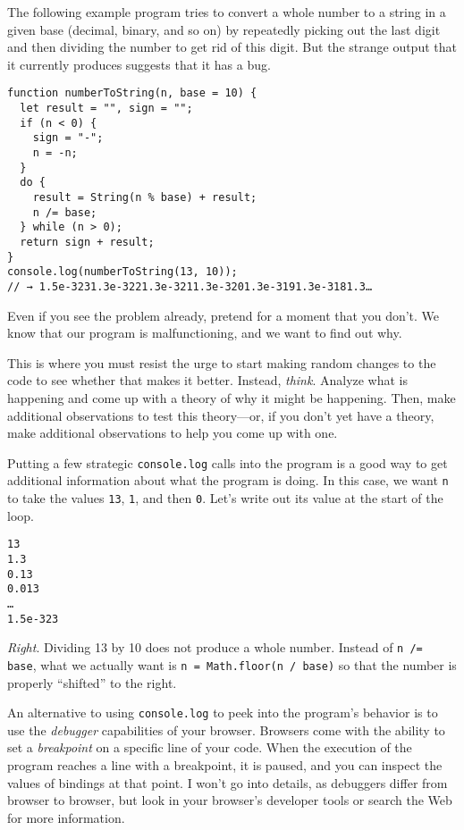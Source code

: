 The following example program tries to convert a whole number to a string in a given base (decimal, binary, and so on) by repeatedly picking out the last digit and then dividing the number to get rid of this digit. But the strange output that it currently produces suggests that it has a bug.

\begin{lstlisting}
function numberToString(n, base = 10) {
  let result = "", sign = "";
  if (n < 0) {
    sign = "-";
    n = -n;
  }
  do {
    result = String(n % base) + result;
    n /= base;
  } while (n > 0);
  return sign + result;
}
console.log(numberToString(13, 10));
// → 1.5e-3231.3e-3221.3e-3211.3e-3201.3e-3191.3e-3181.3…
\end{lstlisting}
\noindent{}

Even if you see the problem already, pretend for a moment that you don't. We know that our program is malfunctioning, and we want to find out why.

This is where you must resist the urge to start making random changes to the code to see whether that makes it better. Instead, \emph{think}. Analyze what is happening and come up with a theory of why it might be happening. Then, make additional observations to test this theory—or, if you don't yet have a theory, make additional observations to help you come up with one.

Putting a few strategic \lstinline`console.log` calls into the program is a good way to get additional information about what the program is doing. In this case, we want \lstinline`n` to take the values \lstinline`13`, \lstinline`1`, and then \lstinline`0`. Let's write out its value at the start of the loop.

\begin{lstlisting}
13
1.3
0.13
0.013
…
1.5e-323
\end{lstlisting}
\noindent{}

\emph{Right}. Dividing 13 by 10 does not produce a whole number. Instead of \lstinline`n /= base`, what we actually want is \lstinline`n = Math.floor(n / base)` so that the number is properly ``shifted'' to the right.

An alternative to using \lstinline`console.log` to peek into the program's behavior is to use the \emph{debugger} capabilities of your browser. Browsers come with the ability to set a \emph{breakpoint} on a specific line of your code. When the execution of the program reaches a line with a breakpoint, it is paused, and you can inspect the values of bindings at that point. I won't go into details, as debuggers differ from browser to browser, but look in your browser's developer
tools or search the Web for more information.

